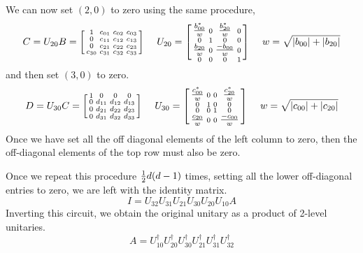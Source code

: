 We can now set $(2,0)$ to zero using the same procedure, 
\[
C = U_{20} B = \begin{bsmallmatrix}
    1 & c_{01} & c_{02} & c_{03} \\ 
    0 & c_{11} & c_{12} & c_{13} \\
    0 & c_{21} & c_{22} & c_{23} \\    
    c_{30} & c_{31} & c_{32} & c_{33}    
    \end{bsmallmatrix}
    \  \quad
 	U_{20} = \begin{bsmallmatrix}
    \tfrac{b^*_{00}}{w} & 0 & \tfrac{b^*_{20}}{w} & 0\\ 
    0 & 1 & 0 & 0 \\     
    \tfrac{b_{20}}{w} & 0 & \tfrac{-b_{00}}{w} & 0 \\   
    0 & 0 & 0 & 1    
    \end{bsmallmatrix}
\  \quad w = \sqrt{|b_{00}| + |b_{20}|}
\notag
\]
and then set $(3,0)$ to zero. 
\[
D = U_{30} C = \begin{bsmallmatrix}
    1 & 0 & 0 & 0 \\ 
    0 & d_{11} & d_{12} & d_{13} \\
    0 & d_{21} & d_{22} & d_{23} \\    
    0 & d_{31} & d_{32} & d_{33}    
    \end{bsmallmatrix}
    \  \quad
 	U_{30} = \begin{bsmallmatrix}
    \tfrac{c^*_{00}}{w} & 0 & 0 & \tfrac{c^*_{20}}{w}\\ 
    0 & 1 & 0 & 0 \\      
    0 & 0 & 1 & 0 \\   
    \tfrac{c_{20}}{w} & 0 & 0 & \tfrac{-c_{00}}{w}
    \end{bsmallmatrix}
\  \quad w = \sqrt{|c_{00}| + |c_{20}|}
\notag
\]
Once we have set all the off diagonal elements of the left column to zero, then the off-diagonal elements of the top row must also be zero.  

Once we repeat this procedure $\tfrac{1}{2} d(d-1)$ times, setting all the lower off-diagonal entries to zero,  we are left with the identity matrix.
\[
I = U_{32} U_{31} U_{21} U_{30} U_{20} U_{10} A
\]
Inverting this circuit, we obtain the original unitary as a product of 2-level unitaries. 
\[
A = U^{\dagger}_{10} U^{\dagger}_{20} U^{\dagger}_{30} U^{\dagger}_{21} U^{\dagger}_{31} U^{\dagger}_{32}
\]


